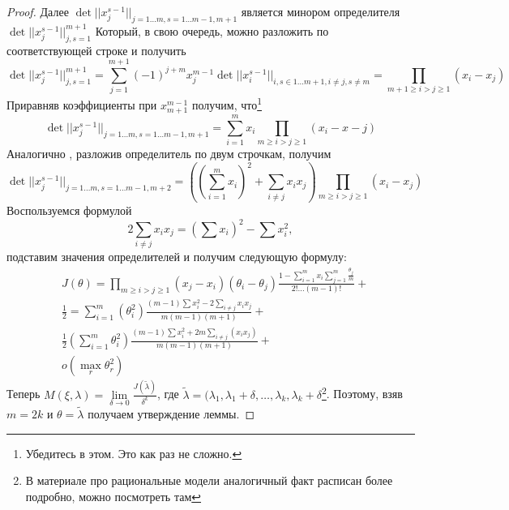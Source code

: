 \begin{proof}
Далее 
$\det ||x_j^{s-1}||_{j=1…m,s=1…m-1,m+1}$
является минором определителя 
$\det ||x_j^{s-1}||_{j,s = 1}^{m+1}$
Который, в свою очередь, можно разложить по соответствующей строке и получить
$$\det ||x_j^{s-1}||_{j,s = 1}^{m+1} = \sum\limits_{j=1}^{m+1} (-1)^{j+m} x_j^{m-1} \det ||x_i^{s-1}||_{i, s \in 1…m+1, i \neq j, s \neq m} = \prod\limits_{m+1 \geq i > j \geq 1}\left(x_i - x_j\right)$$
Приравняв коэффициенты при $x_{m+1}^{m-1}$ получим, что\footnote{Убедитесь в этом. Это как раз не сложно.}
$$\det ||x_j^{s-1}||_{j=1…m,s=1…m-1,m+1} = \sum\limits_{i=1}^{m}x_i \prod \limits_{m \geq i > j \geq 1}(x_i - x-j)$$
Аналогично , разложив определитель по двум строчкам, получим
$$\det ||x_j^{s-1}||_{j=1…m, s=1…m-1, m+2} = \left(\left(\sum\limits_{i=1}^m x_i\right)^2 + \sum\limits_{i\neq j}x_ix_j\right) \prod \limits_{m \geq i > j \geq 1}(x_i - x_j)$$
Воспользуемся формулой
$$2\sum\limits_{i\neq j} x_i x_j = \left(\sum x_i \right)^2 - \sum x_i^2, $$
подставим значения определителей и получим следующую формулу:
\begin{equation}
\label{determinantDecomposition}
\begin{split}
&J(\theta) = \prod \limits_{m \geq i >  j \geq 1}(x_j - x_i)(\theta_i - \theta_j) \frac{1-\sum\limits_{i=1}^{m}x_i\sum\limits_{j=1}^m\frac{\theta_j}{m}}{2!…(m-1)!} + \\
&\frac{1}{2} = \sum\limits_{i=1}^{m}(\theta_i^2)\frac{(m-1)\sum x_i^2 - 2\sum\limits_{i\neq j} x_i x_j}{m(m-1)(m+1)} + \\
& \frac{1}{2} (\sum \limits_{i=1}^{m}\theta_i^2) \frac{(m-1) \sum x_i^2 + 2m \sum\limits_{i \neq j} (x_i x_j)}{m(m-1)(m+1)}+ \\
& o(\max_{r} \theta_r^2)
\end{split}
\end{equation}
Теперь $M(\xi, \lambda) = \lim\limits_{\delta \rightarrow 0}\frac{J(\tilde{\lambda})}{\delta^k}$, где 
$\tilde{\lambda} = (\lambda_1, \lambda_1 + \delta, … , \lambda_k, \lambda_k + \delta$\footnote{В материале про рациональные модели аналогичный факт расписан более подробно, можно посмотреть там}.
Поэтому, взяв $m = 2k$ и $\theta = \tilde{\lambda}$ получаем утверждение леммы.
\end{proof}

